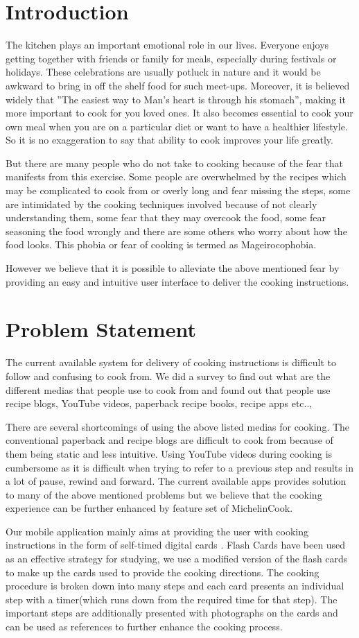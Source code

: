 \section{Introduction} 
The kitchen plays an important emotional role in our lives. Everyone enjoys getting together with friends or family for meals, especially during festivals or holidays. These celebrations are usually potluck in nature and it would be awkward to bring in off the shelf food for such meet-ups. Moreover, it is believed widely that ''The easiest way to Man's heart is through his stomach'', making it more important to cook for you loved ones. It also becomes essential to cook your own meal when you are on a particular diet or want to have a healthier lifestyle. So it is no exaggeration to say that ability to cook improves your life greatly.

But there are many people who do not take to cooking because of the fear that manifests from this exercise. Some people are overwhelmed by the recipes which may be complicated to cook from or overly long and fear missing the steps, some are intimidated by the cooking techniques involved because of not clearly understanding them, some fear that they may overcook the food, some fear seasoning the food wrongly and there are some others who worry about how the food looks. This phobia or fear of cooking is termed as Mageirocophobia.

However we believe that it is possible to alleviate the above mentioned fear by providing an easy and intuitive user interface to deliver the cooking instructions.

\section{Problem Statement}
The current available system for delivery of cooking instructions is difficult to follow and confusing to cook from. We did a survey to find out what are the different medias that people use to cook from and found out that people use recipe blogs, YouTube videos, paperback recipe books, recipe apps etc.., 

There are several shortcomings of using the above listed medias for cooking. The conventional paperback and recipe blogs are difficult to cook from because of them being static and less intuitive. Using YouTube videos during cooking is cumbersome as it is difficult when trying to refer to a previous step and results in a lot of pause, rewind and forward. The current available apps provides solution to many of the above mentioned problems but we believe that the cooking experience can be further enhanced by feature set of MichelinCook.

Our mobile application mainly aims at providing the user with cooking instructions in the form of self-timed digital cards \cite{CardView}. Flash Cards have been used as an effective strategy for studying, we use a modified version of the flash cards to make up the cards used to provide the cooking directions. The cooking procedure is broken down into many steps and each card presents an individual step with a timer(which runs down from the required time for that step). The important steps are additionally presented with photographs on the cards and can be used as references to further enhance the cooking process.